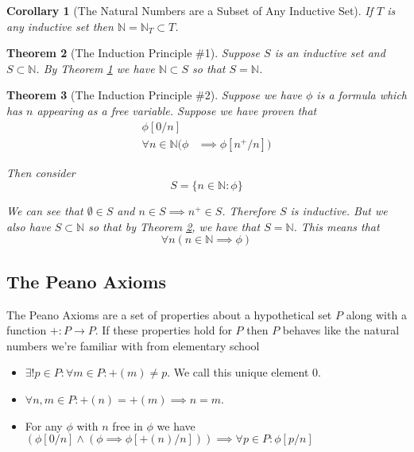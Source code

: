 \documentclass[12pt]{article}
\theoremstyle{break}
\theoremstyle{break}
\newtheorem{theorem}{Theorem}[section]
\theoremstyle{break}
\newtheorem{corollary}[theorem]{Corollary}
\theoremstyle{break}
\theoremstyle{break}
\newtheorem{informal definition}[definition]{Informal Definition}
\begin{document}
\begin{corollary}[The Natural Numbers are a Subset of Any Inductive Set]
\label{corr:natnumsubsetindset}
If $T$ is any inductive set then $\mathbb{N} = \mathbb{N}_T \subset T$.
\end{corollary}

\begin{theorem}[The Induction Principle \#1]
\label{thm:indprinc1}
Suppose $S$ is an inductive set and $S\subset \mathbb{N}$.
By Theorem \ref{corr:natnumsubsetindset} we have $\mathbb{N}\subset S$ so that $S=\mathbb{N}$.
\end{theorem}

\begin{theorem}[The Induction Principle \#2]
\label{thm:indpinc2}
Suppose we have $\phi$ is a formula which has $n$ appearing as a free variable.
Suppose we have proven that
\begin{align*}
\phi[0/n]&\\
\forall n \in \mathbb{N}(\phi& \implies \phi[n^+/n])
\end{align*}

Then consider
$$
S = \{n \in \mathbb{N}: \phi\}
$$

We can see that $\emptyset \in S$ and $n\in S \implies n^+ \in S$.
Therefore $S$ is inductive.
But we also have $S\subset \mathbb{N}$ so that by Theorem \ref{thm:indprinc1}, we have that $S = \mathbb{N}$.
This means that
$$
\forall n (n \in \mathbb{N} \implies \phi)
$$
\end{theorem}

\subsection{The Peano Axioms}

The Peano Axioms are a set of properties about a hypothetical set $P$ along with a function $+: P \to P$.
If these properties hold for $P$ then $P$ behaves like the natural numbers we're familiar with from elementary school

\begin{itemize}
\item{$\exists ! p \in P: \forall m \in P: +(m) \not = p$. We call this unique element $0$.}
\item{$\forall n, m \in P: +(n) = +(m) \implies n=m$.}
\item{For any $\phi$ with $n$ free in $\phi$ we have $(\phi[0/n] \land (\phi \implies \phi[+(n)/n])) \implies \forall p\in P: \phi[p/n]$}
\end{itemize}
\end{document}
